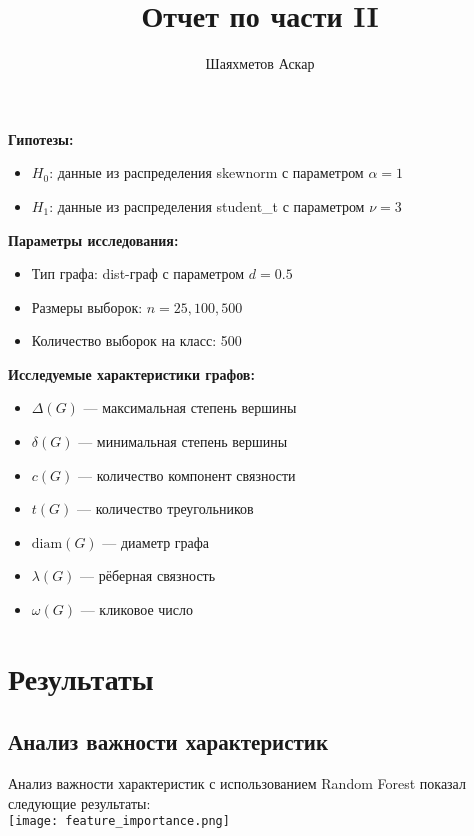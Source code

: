 \documentclass[12pt,a4paper]{article}
\title{Отчет по части II}
\author{Шаяхметов Аскар}
\date{} %
\begin{document}
\maketitle


\textbf{Гипотезы:}
\begin{itemize}
    \item $H_0$: данные из распределения skewnorm с параметром $\alpha = 1$
    \item $H_1$: данные из распределения student\_t с параметром $\nu = 3$
\end{itemize}

\textbf{Параметры исследования:}
\begin{itemize}
    \item Тип графа: dist-граф с параметром $d = 0.5$
    \item Размеры выборок: $n = 25, 100, 500$
    \item Количество выборок на класс: 500
\end{itemize}

\textbf{Исследуемые характеристики графов:}
\begin{itemize}
    \item $\Delta(G)$ --- максимальная степень вершины
    \item $\delta(G)$ --- минимальная степень вершины  
    \item $c(G)$ --- количество компонент связности
    \item $t(G)$ --- количество треугольников
    \item $\text{diam}(G)$ --- диаметр графа
    \item $\lambda(G)$ --- рёберная связность
    \item $\omega(G)$ --- кликовое число
\end{itemize}

\section{Результаты}

\subsection{Анализ важности характеристик}

Анализ важности характеристик с использованием Random Forest показал следующие результаты:\\

\texttt{[image: feature\_importance.png]}
    
\end{document}
